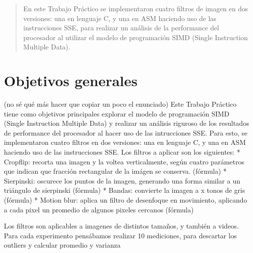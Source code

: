\documentclass[a4paper]{article}
\begin{document}
\thispagestyle{empty}

\maketitle
\newpage

\thispagestyle{empty}
\vfill
\begin{abstract}
En este Trabajo Práctico se implementaron cuatro filtros de imagen en dos versiones: una en lenguaje C, y una en ASM haciendo uso de las instrucciones SSE, para realizar un análisis de la performance del procesador al utilizar el modelo de programación SIMD (Single Instruction Multiple Data). 

\end{abstract}

\thispagestyle{empty}
\vspace{3cm}
\tableofcontents
\newpage


\newpage

\section{Objetivos generales}
(no sé qué más hacer que copiar un poco el enunciado)
Este Trabajo Práctico tiene como objetivos principales explorar el modelo de programación SIMD (Single Instruction Multiple Data) y realizar un análisis riguroso de los resultados de performance del procesador al hacer uso de las intrucciones SSE. Para esto, se implementaron cuatro filtros en dos versiones: una en lenguaje C, y una en ASM haciendo uso de las instrucciones SSE. 
Los filtros a aplicar son los siguientes:
* Cropflip: recorta una imagen y la voltea verticalmente, según cuatro parámetros que indican que fracción rectangular de la imágen se conserva.
(fórmula)
* Sierpinski: oscurece los puntos de la imagen, generando una forma similar a un triángulo de sierpinski
(fórmula)
* Bandas: convierte la imagen a x tonos de gris
(fórmula)
* Motion blur: aplica un filtro de desenfoque en movimiento, aplicando a cada pixel un promedio de algunos pixeles cercanos
(fórmula)

Los filtros son aplicables a imagenes de distintos tamaños, y también a videos.
Para cada experimento pensábamos realizar 10 mediciones, para descartar los outliers y calcular promedio y varianza 
\end{document}

